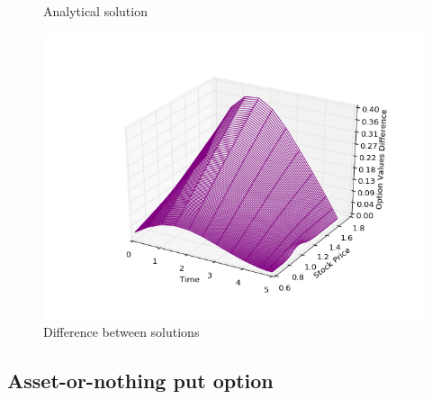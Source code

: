 \documentclass[11pt,a4paper]{extarticle}
\begin{document}
\begin{minipage}{\linewidth}
\begin{minipage}{0.29\linewidth}
\begin{figure}[H]
              \caption{Analytical solution}
          \end{figure}
      \end{minipage}
      \hspace{0.04\linewidth}
      \begin{minipage}{0.29\linewidth}
          \begin{figure}[H]
              \includegraphics[width=\linewidth]{Figures/a-o-n-call-dif}
              \caption{Difference between solutions}
          \end{figure}
      \end{minipage}
\end{minipage}

\subsection{Asset-or-nothing put option}
\end{document}
